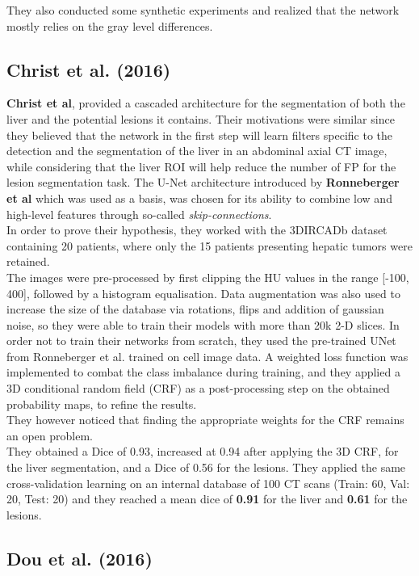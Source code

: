 They also conducted some synthetic experiments and realized that the
network mostly relies on the gray level differences.

\subsection*{Christ et al. (2016)}\label{christ-et-al.-2016}

\textbf{Christ et al}, provided a cascaded architecture for the
segmentation of both the liver and the potential lesions it contains.
Their motivations were similar since they believed that the network in
the first step will learn filters specific to the detection and the
segmentation of the liver in an abdominal axial CT image, while
considering that the liver ROI will help reduce the number of FP for the
lesion segmentation task. The U-Net architecture introduced by
\textbf{Ronneberger et al} which was used as a basis, was chosen for its
ability to combine low and high-level features through so-called
\emph{skip-connections}. \\
In order to prove their hypothesis, they worked with the 3DIRCADb
dataset containing 20 patients, where only the 15 patients presenting
hepatic tumors were retained. \\
The images were pre-processed by first clipping the HU values in the
range {[}-100, 400{]}, followed by a histogram equalisation. Data
augmentation was also used to increase the size of the database via
rotations, flips and addition of gaussian noise, so they were able to
train their models with more than 20k 2-D slices. In order not to train
their networks from scratch, they used the pre-trained UNet from
Ronneberger et al. trained on cell image data. A weighted loss function
was implemented to combat the class imbalance during training, and they
applied a 3D conditional random field (CRF) as a post-processing step on
the obtained probability maps, to refine the results.\\
They however noticed that finding the appropriate weights for the CRF
remains an open problem.\\
They obtained a Dice of 0.93, increased at 0.94 after applying the 3D
CRF, for the liver segmentation, and a Dice of 0.56 for the lesions.
They applied the same cross-validation learning on an internal database
of 100 CT scans (Train: 60, Val: 20, Test: 20) and they reached a mean dice
of \textbf{0.91} for the liver and \textbf{0.61} for the lesions.

\subsection*{Dou et al. (2016)}\label{dou-et-al.-2016}

